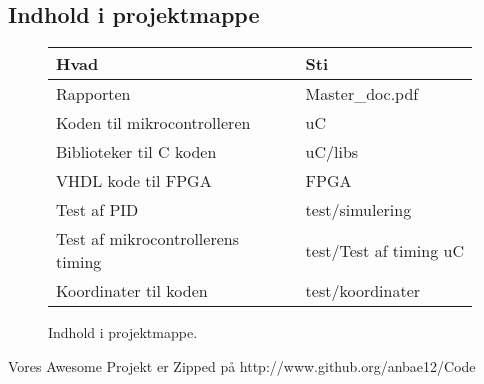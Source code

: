 \newpage

\tableofcontents
\listoffigures
\listoftables  

\subsection*{Indhold i projektmappe}
\begin{figure}[th!]
\centering
\begin{tabular}{l|l}
Hvad&Sti\\\hline
Rapporten&Master\_doc.pdf\\
Koden til mikrocontrolleren &uC\\
Biblioteker til C koden&uC/libs\\
VHDL kode til FPGA &FPGA\\
Test af PID &test/simulering\\
Test af mikrocontrollerens timing&test/Test af timing uC\\
Koordinater til koden &test/koordinater\\

\end{tabular}
\captionsetup{type=table, width=0.6\textwidth}
\caption*{Indhold i projektmappe. \label{tb:CD}}
\end{figure}

Vores Awesome Projekt er Zipped på http://www.github.org/anbae12/Code


